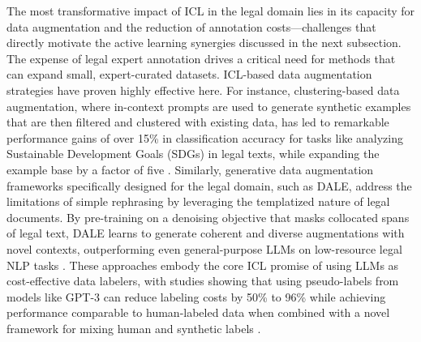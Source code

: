 \documentclass[11pt]{article}
\begin{document}
The most transformative impact of ICL in the legal domain lies in its capacity for data augmentation and the reduction of annotation costs---challenges that directly motivate the active learning synergies discussed in the next subsection. The expense of legal expert annotation drives a critical need for methods that can expand small, expert-curated datasets. ICL-based data augmentation strategies have proven highly effective here. For instance, clustering-based data augmentation, where in-context prompts are used to generate synthetic examples that are then filtered and clustered with existing data, has led to remarkable performance gains of over 15\% in classification accuracy for tasks like analyzing Sustainable Development Goals (SDGs) in legal texts, while expanding the example base by a factor of five \cite{ref572}. Similarly, generative data augmentation frameworks specifically designed for the legal domain, such as DALE, address the limitations of simple rephrasing by leveraging the templatized nature of legal documents. By pre-training on a denoising objective that masks collocated spans of legal text, DALE learns to generate coherent and diverse augmentations with novel contexts, outperforming even general-purpose LLMs on low-resource legal NLP tasks \cite{ref573}. These approaches embody the core ICL promise of using LLMs as cost-effective data labelers, with studies showing that using pseudo-labels from models like GPT-3 can reduce labeling costs by 50\% to 96\% while achieving performance comparable to human-labeled data when combined with a novel framework for mixing human and synthetic labels \cite{ref574}.
\end{document}
